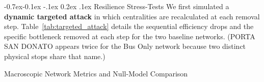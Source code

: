 \documentclass[12pt, a4paper]{article}
\makeatletter
\renewcommand\subsubsection{\@startsection{subsubsection}{3}{\z@}%
                                     {-0.7ex\@plus -0.1ex \@minus -.1ex}%
                                     {0.2ex \@plus .1ex}%
                                     {\normalfont\normalsize\bfseries}}
\makeatother
\begin{document}
\subsubsection{Resilience Stress-Tests}
We first simulated a \textbf{dynamic targeted attack} in which centralities are recalculated at each removal step. Table~\ref{tab:targeted_attack} details the sequential efficiency drops and the specific bottleneck removed at each step for the two baseline networks. (PORTA SAN DONATO appears twice for the Bus Only network because two distinct physical stops share that name.)

\begin{table}[!htbp]
    \centering
    \begin{minipage}{0.48\textwidth}
        \centering
        \caption{Macroscopic Network Metrics and Null-Model Comparison}
        \label{tab:macroscopic}
    \end{minipage}%
    \hfill
    \begin{minipage}{0.48\textwidth}
        \centering
        \caption{Global Efficiency Drop (\%) under Dynamic Targeted Attack}
        \label{tab:targeted_attack}
    \end{minipage}
\end{table}
\end{document}
